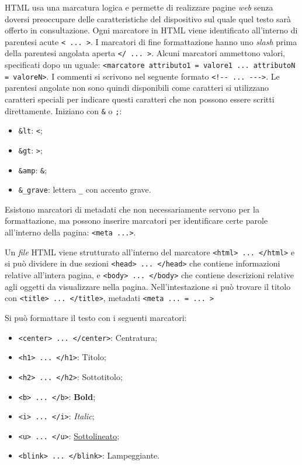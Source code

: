 \documentclass{article}
\numberwithin{equation}{subsection}
\begin{document}
\textcolor{Peach}{HTML} usa una marcatura logica e permette di realizzare pagine \textit{web} senza doversi preoccupare delle caratteristiche del dispositivo sul quale quel testo sarà offerto in 
consultazione. 
Ogni marcatore in \textcolor{Peach}{HTML} viene identificato all'interno di parentesi acute \verb|< ... >|. I marcatori di fine formattazione hanno uno \textit{slash} prima della parentesi angolata 
aperta \verb|</ ... >|. Alcuni marcatori ammettono valori, specificati dopo un uguale: \verb|<marcatore attributo1 = valore1 ... attributoN = valoreN>|. 
I commenti si scrivono nel seguente formato \verb|<!-- ... --->|.
Le parentesi angolate non sono quindi disponibili come caratteri si utilizzano caratteri speciali per indicare questi caratteri che non possono essere scritti 
direttamente. Iniziano con \verb|&| o \verb|;|:
\begin{itemize}
    \item \verb|&lt|: \verb|<|;
    \item \verb|&gt|: \verb|>|;
    \item \verb|&amp|: \verb|&|;
    \item \verb|&_grave|: lettera \verb|_| con accento grave. 
\end{itemize} 

Esistono marcatori di metadati che non necessariamente servono per la formattazione, ma possono inserire marcatori per identificare certe parole all'interno della pagina: \verb|<meta ...>|. 

Un \textit{file} \textcolor{Peach}{HTML} viene strutturato all'interno del marcatore \verb|<html> ... </html>| e si può dividere in due sezioni \verb|<head> ... </head>| che contiene informazioni relative all'intera pagina, 
e \verb|<body> ... </body>| che contiene descrizioni relative agli oggetti da visualizzare nella pagina. 
Nell'intestazione si può trovare il titolo con \verb|<title> ... </title>|, metadati \verb|<meta ... = ... >|

Si può formattare il testo con i seguenti marcatori:
\begin{itemize}
    \item \verb|<center> ... </center>|: Centratura;
    \item \verb|<h1> ... </h1>|: Titolo;
    \item \verb|<h2> ... </h2>|: Sottotitolo;
    \item \verb|<b> ... </b>|: \textbf{Bold};
    \item \verb|<i> ... </i>|: \textit{Italic};
    \item \verb|<u> ... </u>|: \underline{Sottolineato};
    \item \verb|<blink> ... </blink>|: Lampeggiante. 
\end{itemize}
\end{document}
